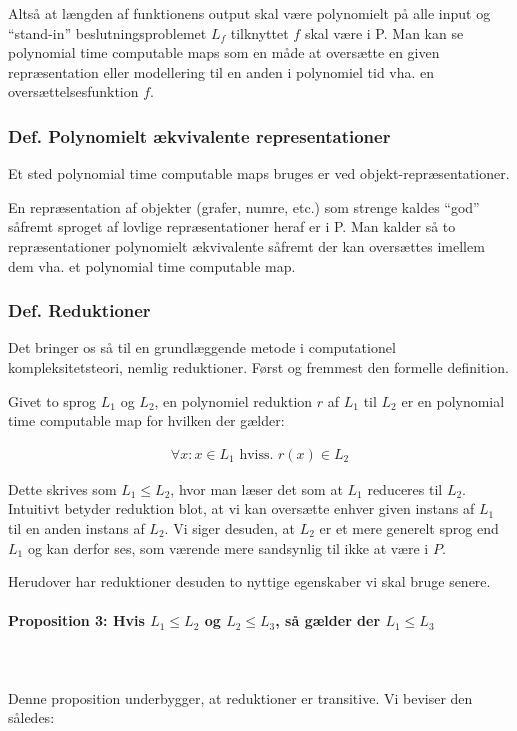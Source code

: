 Altså at længden af funktionens output skal være polynomielt på alle input og ``stand-in'' beslutningsproblemet $L_f$ tilknyttet $f$ skal være i P. Man kan se polynomial time computable maps som en måde at oversætte en given repræsentation eller modellering til en anden i polynomiel tid vha. en oversættelsesfunktion $f$.

\subsubsection{Def. Polynomielt ækvivalente representationer}

Et sted polynomial time computable maps bruges er ved objekt-repræsentationer.

En repræsentation af objekter (grafer, numre, etc.) som strenge kaldes ``god'' såfremt sproget af lovlige repræsentationer heraf er i P. Man kalder så to repræsentationer polynomielt ækvivalente såfremt der kan oversættes imellem dem vha. et polynomial time computable map.


\subsubsection{Def. Reduktioner}

Det bringer os så til en grundlæggende metode i computationel kompleksitetsteori, nemlig reduktioner. Først og fremmest den formelle definition.

Givet to sprog $L_1$ og $L_2$, en polynomiel reduktion $r$ af $L_1$ til $L_2$ er en polynomial time computable map for hvilken der gælder:

\begin{align*}
 \forall x : x \in L_1 \text{ hviss. } r(x) \in L_2
\end{align*}

Dette skrives som $L_1 \leq L_2$, hvor man læser det som at $L_1$ reduceres til $L_2$. Intuitivt betyder reduktion blot, at vi kan oversætte enhver given instans af $L_1$ til en anden instans af $L_2$. Vi siger desuden, at $L_2$ er et mere generelt sprog end $L_1$ og kan derfor ses, som værende mere sandsynlig til ikke at være i $P$.


Herudover har  reduktioner desuden to nyttige egenskaber vi skal bruge senere.

\paragraph{Proposition 3: Hvis $L_1 \leq L_2$ og $L_2 \leq L_3$, så gælder der $L_1 \leq L_3$}
~\\
~\\
Denne proposition underbygger, at reduktioner er transitive. Vi beviser den således:

